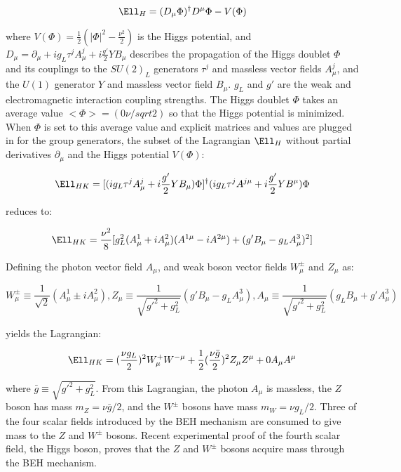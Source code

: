 \begin{equation}
	\Ell_{H} = (D_{\mu}\Phi)^{\dagger}D^{\mu}\Phi - V(\Phi)
\end{equation}

where $V(\Phi) = \frac{1}{2}(|\Phi|^{2} - \frac{\nu^{2}}{2})$ is the Higgs potential, and 
$D_{\mu} = \partial_{\mu} + ig_{L}\tau^{j}A^{j}_{\mu} + i\frac{g'}{2}YB_{\mu}$ describes the propagation 
of the Higgs doublet $\Phi$ and its couplings to the $SU(2)_L$ generators $\tau^{j}$ and massless vector 
fields $A^{j}_{\mu}$, and the $U(1)$ generator $Y$ and massless vector field $B_{\mu}$.  $g_{L}$ and 
$g'$ are the weak and electromagnetic interaction coupling strengths.  The Higgs doublet $\Phi$ takes an 
average value $<\Phi> = (0  \nu/sqrt{2})$ so that the Higgs potential is minimized.  When $\Phi$ is set 
to this average value and explicit matrices and values are plugged in for the group generators, the subset 
of the Lagrangian $\Ell_{H}$ without partial derivatives $\partial_{\mu}$ and the Higgs potential $V(\Phi)$:

\begin{equation}
	\Ell_{HK} = [(ig_{L}\tau^{j}A^{j}_{\mu} + i\frac{g'}{2}YB_{\mu})\Phi]^{\dagger}(ig_{L}\tau^{j}A^{j\mu} + i\frac{g'}{2}YB^{\mu})\Phi
\end{equation}

reduces to:

\begin{equation}
	\Ell_{HK} = \frac{\nu^{2}}{8}[g^{2}_{L}(A^{1}_{\mu} + iA^{2}_{\mu})(A^{1\mu} - iA^{2\mu}) + (g'B_{\mu} - g_{L}A^{3}_{\mu})^{2}]
\end{equation}

Defining the photon vector field $A_{\mu}$, and weak boson vector fields $W^{\pm}_{\mu}$ and $Z_{\mu}$ as:

\begin{equation}
	W^{\pm}_{\mu} \equiv \frac{1}{\sqrt{2}}(A^{1}_{\mu} \pm iA^{2}_{\mu}), 
	Z_{\mu} \equiv \frac{1}{\sqrt{g'^{2} + g^{2}_{L}}}(g'B_{\mu} - g_{L}A^{3}_{\mu}), 
	A_{\mu} \equiv \frac{1}{\sqrt{g'^{2} + g^{2}_{L}}}(g_{L}B_{\mu} + g'A^{3}_{\mu})
\end{equation}

yields the Lagrangian:

\begin{equation}
	\Ell_{HK} = (\frac{\nu g_{L}}{2})^{2}W^{+}_{\mu}W^{-\mu} + \frac{1}{2}(\frac{\nu \bar{g}}{2})^{2}Z_{\mu}Z^{\mu} + 0A_{\mu}A^{\mu}
\end{equation}

where $\bar{g} \equiv \sqrt{g'^{2} + g^{2}_{L}}$.  From this Lagrangian, the photon $A_{\mu}$ is massless, 
the $Z$ boson has mass $m_{Z} = \nu\bar{g}/2$, and the $W^{\pm}$ bosons have mass $m_{W} = \nu g_{L}/2$.  
Three of the four scalar fields introduced by the BEH mechanism are consumed to give mass to the $Z$ 
and $W^{\pm}$ bosons.  Recent experimental proof of the fourth scalar field, the Higgs boson, 
\cite{} proves that the $Z$ and $W^{\pm}$ bosons acquire mass through the BEH mechanism.

